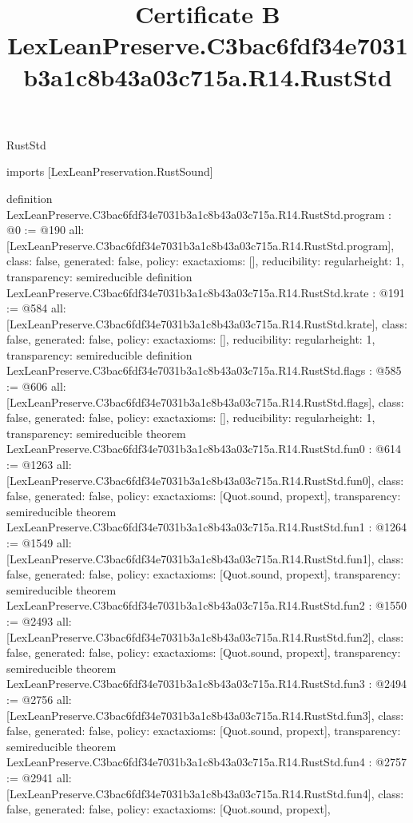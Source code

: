 \begin{lexlean}{RustStd}
\title{Certificate B LexLeanPreserve.C3bac6fdf34e7031b3a1c8b43a03c715a.R14.RustStd}
\begin{coremodule}
imports [LexLeanPreservation.RustSound]

definition LexLeanPreserve.C3bac6fdf34e7031b3a1c8b43a03c715a.R14.RustStd.program : @0 := @190 {
  all: [LexLeanPreserve.C3bac6fdf34e7031b3a1c8b43a03c715a.R14.RustStd.program],
  class: false,
  generated: false,
  policy: exact{axioms: []},
  reducibility: regular{height: 1},
  transparency: semireducible
}
definition LexLeanPreserve.C3bac6fdf34e7031b3a1c8b43a03c715a.R14.RustStd.krate : @191 := @584 {
  all: [LexLeanPreserve.C3bac6fdf34e7031b3a1c8b43a03c715a.R14.RustStd.krate],
  class: false,
  generated: false,
  policy: exact{axioms: []},
  reducibility: regular{height: 1},
  transparency: semireducible
}
definition LexLeanPreserve.C3bac6fdf34e7031b3a1c8b43a03c715a.R14.RustStd.flags : @585 := @606 {
  all: [LexLeanPreserve.C3bac6fdf34e7031b3a1c8b43a03c715a.R14.RustStd.flags],
  class: false,
  generated: false,
  policy: exact{axioms: []},
  reducibility: regular{height: 1},
  transparency: semireducible
}
theorem LexLeanPreserve.C3bac6fdf34e7031b3a1c8b43a03c715a.R14.RustStd.fun0 : @614 := @1263 {
  all: [LexLeanPreserve.C3bac6fdf34e7031b3a1c8b43a03c715a.R14.RustStd.fun0],
  class: false,
  generated: false,
  policy: exact{axioms: [Quot.sound, propext]},
  transparency: semireducible
}
theorem LexLeanPreserve.C3bac6fdf34e7031b3a1c8b43a03c715a.R14.RustStd.fun1 : @1264 := @1549 {
  all: [LexLeanPreserve.C3bac6fdf34e7031b3a1c8b43a03c715a.R14.RustStd.fun1],
  class: false,
  generated: false,
  policy: exact{axioms: [Quot.sound, propext]},
  transparency: semireducible
}
theorem LexLeanPreserve.C3bac6fdf34e7031b3a1c8b43a03c715a.R14.RustStd.fun2 : @1550 := @2493 {
  all: [LexLeanPreserve.C3bac6fdf34e7031b3a1c8b43a03c715a.R14.RustStd.fun2],
  class: false,
  generated: false,
  policy: exact{axioms: [Quot.sound, propext]},
  transparency: semireducible
}
theorem LexLeanPreserve.C3bac6fdf34e7031b3a1c8b43a03c715a.R14.RustStd.fun3 : @2494 := @2756 {
  all: [LexLeanPreserve.C3bac6fdf34e7031b3a1c8b43a03c715a.R14.RustStd.fun3],
  class: false,
  generated: false,
  policy: exact{axioms: [Quot.sound, propext]},
  transparency: semireducible
}
theorem LexLeanPreserve.C3bac6fdf34e7031b3a1c8b43a03c715a.R14.RustStd.fun4 : @2757 := @2941 {
  all: [LexLeanPreserve.C3bac6fdf34e7031b3a1c8b43a03c715a.R14.RustStd.fun4],
  class: false,
  generated: false,
  policy: exact{axioms: [Quot.sound, propext]},
}
\end{coremodule}
\end{lexlean}
